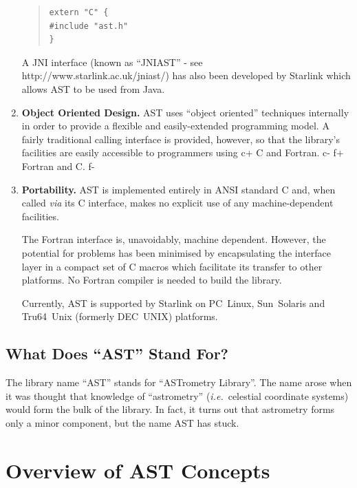 \documentclass[twoside,11pt]{article}
\newcommand{\htmladdnormallink}[2]{#1}
\begin{document}
\begin{enumerate}
\begin{quote}
\small
\begin{verbatim}
extern "C" {
#include "ast.h"
}
\end{verbatim}
\normalsize
\end{quote}

A JNI interface (known as ``JNIAST'' - see
\htmladdnormallink{http://www.starlink.ac.uk/jniast/}
{http://www.starlink.ac.uk/jniast/}) has also been developed by Starlink
which allows AST to be used from Java.

\item {\bf{Object Oriented Design.}}
AST uses ``object oriented'' techniques internally in order to provide
a flexible and easily-extended programming model.  A fairly
traditional calling interface is provided, however, so that the
library's facilities are easily accessible to programmers using
c+
C and Fortran.
c-
f+
Fortran and C.
f-

\item {\bf{Portability.}}
AST is implemented entirely in ANSI standard C and, when called
{\em{via}} its C interface, makes no explicit use of any
machine-dependent facilities.

The Fortran interface is, unavoidably, machine dependent. However, the
potential for problems has been minimised by encapsulating the
interface layer in a compact set of C macros which facilitate its
transfer to other platforms. No Fortran compiler is needed to build
the library.

Currently, AST is supported by Starlink on PC~Linux, Sun~Solaris and
Tru64~Unix (formerly DEC~UNIX) platforms.
\end{enumerate}

\subsection{What Does ``AST'' Stand For?}

The library name ``AST'' stands for ``ASTrometry Library''. The name
arose when it was thought that knowledge of ``astrometry''
({\em{i.e.}}\ celestial coordinate systems) would form the bulk of the
library.  In fact, it turns out that astrometry forms only a minor
component, but the name AST has stuck.

\cleardoublepage
\section{Overview of AST Concepts}
\end{document}
